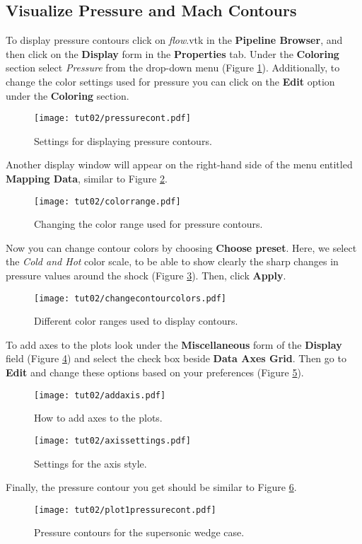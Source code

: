 \subsection{Visualize Pressure and Mach Contours}
To display pressure contours click on \textit{flow}.vtk in the \textbf{Pipeline Browser}, and then click on the \textbf{Display} form in the \textbf{Properties} tab. Under the \textbf{Coloring} section select \textit{Pressure} from the drop-down menu (Figure \ref{fig2:pressure contours setting}). Additionally, to change the color settings used for pressure you can click on the \textbf{Edit} option under the \textbf{Coloring} section.
\begin{figure}[htbp]
    \centering
    \texttt{[image: tut02/pressurecont.pdf]}
    \caption{Settings for displaying pressure contours.}
    \label{fig2:pressure contours setting}
\end{figure}
Another display window will appear on the right-hand side of the menu entitled \textbf{Mapping Data}, similar to Figure \ref{fig2:color_range}.
\begin{figure}[htbp]
    \centering
    \texttt{[image: tut02/colorrange.pdf]}
    \caption{Changing the color range used for pressure contours.}
    \label{fig2:color_range}
\end{figure}
Now you can change contour colors by choosing \textbf{Choose preset}. Here, we select the \textit{Cold and Hot} color scale, to be able to show clearly the sharp changes in pressure values around the shock (Figure \ref{fig2:color_range_item}). Then, click \textbf{Apply}.
\begin{figure}[htbp]
    \centering
    \texttt{[image: tut02/changecontourcolors.pdf]}
    \caption{Different color ranges used to display contours.}
    \label{fig2:color_range_item}
\end{figure}
To add axes to the plots look under the \textbf{Miscellaneous} form of the \textbf{Display} field (Figure \ref{fig2:add axis}) and select the check box beside \textbf{Data Axes Grid}. Then go to \textbf{Edit} and change these options based on your preferences (Figure \ref{fig2:axis setting}).
\begin{figure}[htbp]
    \centering
    \texttt{[image: tut02/addaxis.pdf]}
    \caption{How to add axes to the plots.}
    \label{fig2:add axis}
\end{figure}
\begin{figure}[htbp]
    \centering
    \texttt{[image: tut02/axissettings.pdf]}
    \caption{Settings for the axis style.}
    \label{fig2:axis setting}
\end{figure}
Finally, the pressure contour you get should be similar to Figure \ref{fig2:plot pressure cont1}.
\begin{figure}[htbp]
    \centering
    \texttt{[image: tut02/plot1pressurecont.pdf]}
    \caption{Pressure contours for the supersonic wedge case.}
    \label{fig2:plot pressure cont1}
\end{figure}


